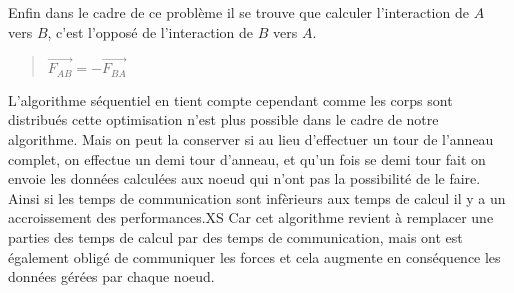 \par Enfin dans le cadre de ce problème il se trouve que calculer l'interaction de $A$
vers $B$, c'est l'opposé de l'interaction de $B$ vers $A$.

\begin{quote}
  \begin{center}
    $ \overrightarrow{F_{AB}} = -\overrightarrow{F_{BA}} $
  \end{center}
\end{quote}

\par L'algorithme séquentiel en tient compte cependant comme les corps sont distribués
cette optimisation n'est plus possible dans le cadre de notre algorithme.
Mais on peut la conserver si au lieu d'effectuer un tour de l'anneau complet, on effectue
un demi tour d'anneau, et qu'un fois se demi tour fait on envoie les données calculées 
aux noeud qui n'ont pas la possibilité de le faire. Ainsi si les temps de communication
sont infèrieurs aux temps de calcul il y a un accroissement des performances.XS Car 
cet algorithme revient à remplacer une parties des temps de calcul par des temps de communication, 
mais ont est également obligé de communiquer les forces et cela augmente en conséquence 
les données gérées par chaque noeud.\\
